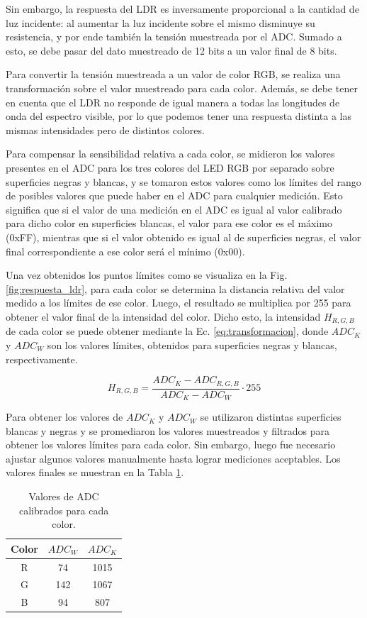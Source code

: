 \documentclass[12pt,a4paper,twoside,fleqn]{article}
\begin{document}
Sin embargo, la respuesta del LDR es inversamente proporcional a la cantidad de luz incidente: al aumentar la luz incidente sobre el mismo disminuye su resistencia, y por ende también la tensión muestreada por el ADC. Sumado a esto, se debe pasar del dato muestreado de 12 bits a un valor final de 8 bits.

Para convertir la tensión muestreada a un valor de color RGB, se realiza una transformación sobre el valor muestreado para cada color. Además, se debe tener en cuenta que el LDR no responde de igual manera a todas las longitudes de onda del espectro visible, por lo que podemos tener una respuesta distinta a las mismas intensidades pero de distintos colores. 

Para compensar la sensibilidad relativa a cada color, se midieron los valores presentes en el ADC para los tres colores del LED RGB por separado sobre superficies negras y blancas, y se tomaron estos valores como los límites del rango de posibles valores que puede haber en el ADC para cualquier medición. Esto significa que si el valor de una medición en el ADC es igual al valor calibrado para dicho color en superficies blancas, el valor para ese color es el máximo (0xFF), mientras que si el valor obtenido es igual al de superficies negras, el valor final correspondiente a ese color será el mínimo (0x00).

Una vez obtenidos los puntos límites como se visualiza en la Fig. \ref{fig:respuesta_ldr}, para cada color se determina la distancia relativa del valor medido a los límites de ese color. Luego, el resultado se multiplica por 255 para obtener el valor final de la intensidad del color. Dicho esto, la intensidad $H_{R,G,B}$ de cada color se puede obtener mediante la Ec. \eqref{eq:transformacion}, donde $ADC_K$ y $ADC_W$ son los valores límites, obtenidos para superficies negras y blancas, respectivamente.

\begin{equation}
    H_{R,G,B} = \frac{ADC_K - ADC_{R,G,B}}{ADC_K - ADC_W} \cdot 255
    \label{eq:transformacion}
\end{equation}

Para obtener los valores de $ADC_K$ y $ADC_W$ se utilizaron distintas superficies blancas y negras y se promediaron los valores muestreados y filtrados para obtener los valores límites para cada color. Sin embargo, luego fue necesario ajustar algunos valores manualmente hasta lograr mediciones aceptables. Los valores finales se muestran en la Tabla \ref{tab:calibracion_adc}.
\begin{table}
    \centering
    \begin{tabular}{c|c|c}
        Color & $ADC_W$ & $ADC_K$ \\
        \hline 
        R & 74 & 1015 \\
        G & 142 & 1067\\
        B & 94 & 807
    \end{tabular}
    \caption{Valores de ADC calibrados para cada color.}
    \label{tab:calibracion_adc}
\end{table}
\end{document}
